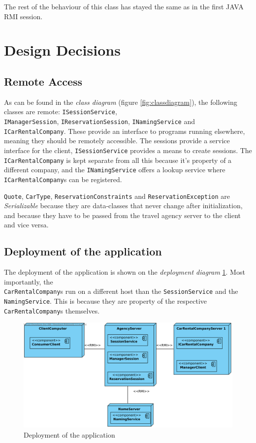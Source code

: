 \documentclass[a4paper]{article}
\begin{document}
The rest of the behaviour of this class has stayed the same as in the first JAVA RMI session.

\section{Design Decisions}

\subsection{Remote Access}
As can be found in the \emph{class diagram} (figure \ref{fig:classdiagram}), the following classes are remote: \texttt{ISessionService}, \\ \texttt{IManagerSession}, \texttt{IReservationSession}, \texttt{INamingService} and \texttt{ICarRentalCompany}. These provide an interface to programs running elsewhere, meaning they should be remotely accessible.
The sessions provide a service interface for the client, \texttt{ISessionService} provides a means to create sessions. The \texttt{ICarRentalCompany} is kept separate from all this because it's property of a different company, and the \texttt{INamingService} offers a lookup service where \texttt{ICarRentalCompany}s can be registered.

\texttt{Quote}, \texttt{CarType}, \texttt{ReservationConstraints} and \texttt{ReservationException} are \emph{Serializable} because they are data-classes that never change after initialization, and because they have to be passed from the travel agency server to the client and vice versa. 

\subsection{Deployment of the application}
The deployment of the application is shown on the \emph{deployment diagram} \ref{fig:deployment}.
Most importantly, the \\ \texttt{CarRentalCompany}s run on a different host than the \texttt{SessionService} and the \texttt{NamingService}. This is because they are property of the respective \texttt{CarRentalCompany}s themselves. 

\begin{figure}[hbtp]
\centering
\includegraphics[width=\textwidth]{img/Deployment Diagram.png}
\caption{Deployment of the application}
\label{fig:deployment}
\end{figure}
\end{document}
